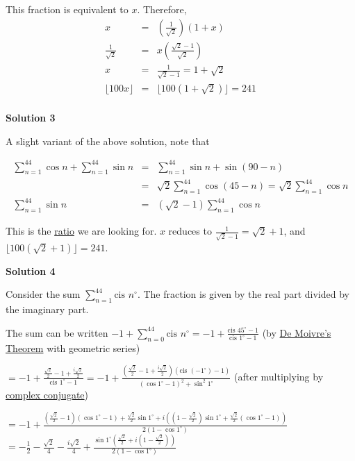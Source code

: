 \begin{enumerate}
 This fraction is equivalent to $x$.  Therefore,
 \begin{eqnarray*} x &=& \left(\frac {1}{\sqrt {2}}\right)\left(1 + x\right)\\ \frac {1}{\sqrt {2}} &=& x\left(\frac {\sqrt {2} - 1}{\sqrt {2}}\right)\\ x &=& \frac {1}{\sqrt {2} - 1} = 1 + \sqrt {2}\\ \lfloor 100x \rfloor &=& \lfloor 100(1 + \sqrt {2}) \rfloor = \boxed{241}\\ \end{eqnarray*}




\textbf{Solution 3}

A slight variant of the above solution, note that 

 
 \begin{eqnarray*} \sum_{n=1}^{44} \cos n + \sum_{n=1}^{44} \sin n &=& \sum_{n=1}^{44} \sin n + \sin(90-n)\\ &=& \sqrt{2}\sum_{n=1}^{44} \cos(45-n) = \sqrt{2}\sum_{n=1}^{44} \cos n\\ \sum_{n=1}^{44} \sin n &=& (\sqrt{2}-1)\sum_{n=1}^{44} \cos n \end{eqnarray*}

 This is the \href{https://artofproblemsolving.com/wiki/index.php?title=Ratio}{ratio} we are looking for. $x$ reduces to $\frac{1}{\sqrt{2} - 1} = \sqrt{2} + 1$, and $\lfloor 100(\sqrt{2} + 1)\rfloor = \boxed{241}$.

 



\textbf{Solution 4}

Consider the sum $\sum_{n = 1}^{44} \text{cis } n^\circ$. The fraction is given by the real part divided by the imaginary part.

 The sum can be written $- 1 + \sum_{n = 0}^{44} \text{cis } n^\circ = - 1 + \frac {\text{cis } 45^\circ - 1}{\text{cis } 1^\circ - 1}$ (by \href{https://artofproblemsolving.com/wiki/index.php?title=De\_Moivre\%27s\_Theorem}{De Moivre's Theorem} with geometric series)

 $= - 1 + \frac {\frac {\sqrt {2}}{2} - 1 + \frac {i \sqrt {2}}{2}}{\text{cis } 1^\circ - 1} = - 1 + \frac {\left( \frac {\sqrt {2}}{2} - 1 + \frac {i \sqrt {2}}{2} \right) (\text{cis } ( - 1^\circ) - 1)}{(\cos 1^\circ - 1)^2 + \sin^2 1^\circ}$ (after multiplying by \href{https://artofproblemsolving.com/wiki/index.php?title=Complex\_conjugate}{complex conjugate})

 $= - 1 + \frac {\left( \frac {\sqrt {2}}{2} - 1 \right) (\cos 1^\circ - 1) + \frac {\sqrt {2}}{2}\sin 1^\circ + i\left( \left(1 - \frac {\sqrt {2}}{2} \right) \sin 1^\circ + \frac {\sqrt {2}}{2} (\cos 1^\circ - 1)\right)}{2(1 - \cos 1^\circ)}$
$= - \frac {1}{2} - \frac {\sqrt {2}}{4} - \frac {i\sqrt {2}}{4} + \frac {\sin 1^\circ \left( \frac {\sqrt {2}}{2} + i\left( 1 - \frac {\sqrt {2}}{2} \right) \right)}{2(1 - \cos 1^\circ)}$


\end{enumerate}
